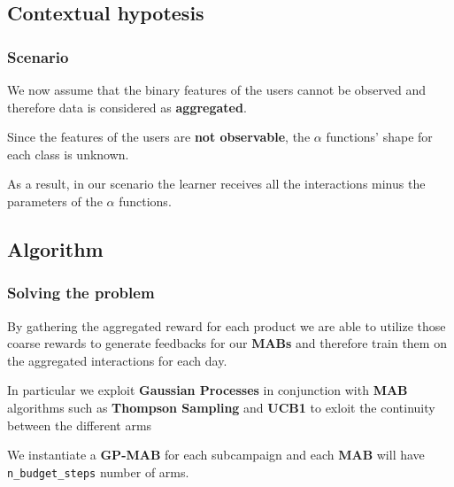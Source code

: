 
\subsection{Contextual hypotesis}


\begin{frame}

\frametitle{Scenario}

We now assume that the binary features of the users cannot be observed and therefore data is considered as \textbf{aggregated}.

Since the features of the users are \textbf{not observable}, the $\alpha$ functions' shape for each class is unknown.

As a result, in our scenario the learner receives all the interactions minus the parameters of the $\alpha$ functions.

\end{frame}


\subsection{Algorithm}


\begin{frame}

\frametitle{Solving the problem}

By gathering the aggregated reward for each product we are able to utilize those coarse rewards to generate feedbacks for our \textbf{MABs} and therefore train them on the aggregated interactions for each day.

In particular we exploit \textbf{Gaussian Processes} in conjunction with \textbf{MAB} algorithms such as \textbf{Thompson Sampling} and \textbf{UCB1} to exloit the continuity between the different arms

We instantiate a \textbf{GP-MAB} for each subcampaign and each \textbf{MAB} will have \texttt{n\_budget\_steps} number of arms.

\end{frame}


